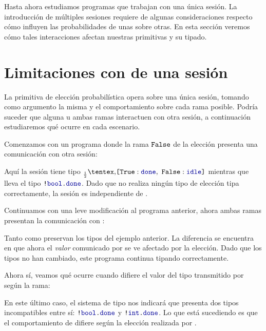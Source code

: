 Hasta ahora estudiamos programas que trabajan con una única sesión. La
introducción de múltiples sesiones requiere de algunas consideraciones respecto
cómo influyen las probabilidades de unas sobre otras. En esta sección veremos
cómo tales interacciones afectan nuestras primitivas y su tipado.

\section{Limitaciones con  de una sesión}

La primitiva de elección probabilística  opera sobre una única sesión,
tomando como argumento la misma y el comportamiento sobre cada rama posible.
Podría suceder que alguna u ambas ramas interactuen con otra sesión, a
continuación estudiaremos qué ocurre en cada escenario.

Comenzamos con un programa donde la rama $\Tag[False]$ de la elección presenta
una comunicación con otra sesión:

\TwoSessionsPickSingleBranch

Aquí la sesión  tiene tipo $\BinaryPChoice[\frac{1}{2}]{\Done}{\Idle}$
mientras que  lleva el tipo $\Out\tbool\Done$. Dado que  no
realiza ningún tipo de elección tipa correctamente, la sesión es independiente
de .

Continuamos con una leve modificación al programa anterior, ahora ambas ramas
presentan la comunicación con :

\TwoSessionsPickBothBranches

Tanto  como  preservan los tipos del ejemplo anterior. La
diferencia se encuentra en que ahora el \emph{valor} comunicado por  se
ve afectado por la elección. Dado que los tipos no han cambiado, este programa
continua tipando correctamente.

Ahora sí, veamos qué ocurre cuando difiere el valor del tipo transmitido por
 según la rama:

\TwoSessionsInvalidPickBothBranches

En este último caso, el sistema de tipo nos indicará que  presenta dos
tipos incompatibles entre sí: $\Out\tbool\Done$ y $\Out\tint\Done$. Lo que está
sucediendo es que el comportamiento de  difiere según la elección
realizada por .

\TwoSessionsPickTwo
